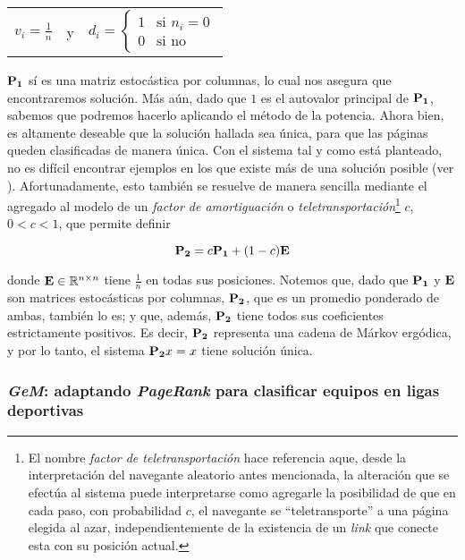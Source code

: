         \begin{center}\begin{tabular}{ccc}
            $\displaystyle v_i = \frac{1}{n}$ & \qquad y & \qquad $d_i = \begin{cases} 1 & \text{si }n_i = 0 \\ 0 & \text{si no} \end{cases}$
        \end{tabular}\end{center}

        $\mathbf{P_1}$ sí es una matriz estocástica por columnas, lo cual nos asegura que encontraremos solución. Más aún, dado que $1$ es el autovalor principal de $\mathbf{P_1}$, sabemos que podremos hacerlo aplicando el método de la potencia. Ahora bien, es altamente deseable que la solución hallada sea única, para que las páginas queden clasificadas de manera única. Con el sistema tal y como está planteado, no es difícil encontrar ejemplos en los que existe más de una solución posible (ver \cite{Bryan2006}). Afortunadamente, esto también se resuelve de manera sencilla mediante el agregado al modelo de un \emph{factor de amortiguación} o \emph{teletransportación}\footnote{El nombre \emph{factor de teletransportación} hace referencia aque, desde la interpretación del navegante aleatorio antes mencionada, la alteración que se efectúa al sistema puede interpretarse como agregarle la posibilidad de que en cada paso, con probabilidad $c$, el navegante se ``teletransporte'' a una página elegida al azar, independientemente de la existencia de un \emph{link} que conecte esta con su posición actual.} $c$, $0 < c < 1$, que permite definir

        \[ \mathbf{P_2} = c \mathbf{P_1} + (1 - c) \mathbf{E} \]

        \noindent donde $\mathbf{E} \in \mathbb{R}^{n \times n}$ tiene $\frac{1}{n}$ en todas sus posiciones. Notemos que, dado que $\mathbf{P_1}$ y $\mathbf{E}$ son matrices estocásticas por columnas, $\mathbf{P_2}$, que es un promedio ponderado de ambas, también lo es; y que, además, $\mathbf{P_2}$ tiene todos sus coeficientes estrictamente positivos. Es decir, $\mathbf{P_2}$ representa una cadena de Márkov ergódica, y por lo tanto, el sistema $\mathbf{P_2} x = x$ tiene solución única.

        \subsubsection{\emph{GeM}: adaptando \emph{PageRank} para clasificar equipos en ligas deportivas}

